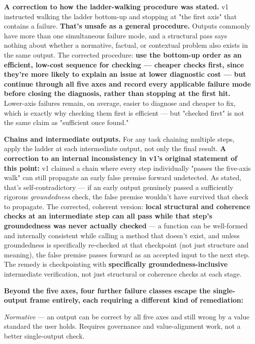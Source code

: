 \textbf{A correction to how the ladder-walking procedure was stated.} v1 instructed walking the ladder bottom-up and stopping at "the first axis" that contains a failure. \textbf{That's unsafe as a general procedure.} Outputs commonly have more than one simultaneous failure mode, and a structural pass says nothing about whether a normative, factual, or contextual problem also exists in the same output. The corrected procedure: \textbf{use the bottom-up order as an efficient, low-cost sequence for checking --- cheaper checks first, since they're more likely to explain an issue at lower diagnostic cost --- but continue through all five axes and record every applicable failure mode before closing the diagnosis, rather than stopping at the first hit.} Lower-axis failures remain, on average, easier to diagnose and cheaper to fix, which is exactly why checking them first is efficient --- but "checked first" is not the same claim as "sufficient once found."

\textbf{Chains and intermediate outputs.} For any task chaining multiple steps, apply the ladder at each intermediate output, not only the final result. \textbf{A correction to an internal inconsistency in v1's original statement of this point:} v1 claimed a chain where every step individually "passes the five-axis walk" can still propagate an early false premise forward undetected. As stated, that's self-contradictory --- if an early output genuinely passed a sufficiently rigorous \emph{groundedness} check, the false premise wouldn't have survived that check to propagate. The corrected, coherent version: \textbf{local structural and coherence checks at an intermediate step can all pass while that step's groundedness was never actually checked} --- a function can be well-formed and internally consistent while calling a method that doesn't exist, and unless groundedness is specifically re-checked at that checkpoint (not just structure and meaning), the false premise passes forward as an accepted input to the next step. The remedy is checkpointing with \textbf{specifically groundedness-inclusive} intermediate verification, not just structural or coherence checks at each stage.

\textbf{Beyond the five axes, four further failure classes escape the single-output frame entirely, each requiring a different kind of remediation:}

\emph{Normative} --- an output can be correct by all five axes and still wrong by a value standard the user holds. Requires governance and value-alignment work, not a better single-output check.

